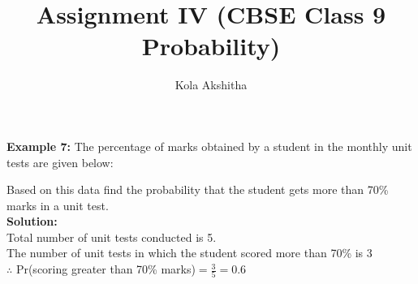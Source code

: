 \documentclass[journal,12pt,onecolumn]{IEEEtran}
\newcommand{\solution}{\noindent \textbf{Solution: }}
\begin{document}
\vspace{3cm}
\title{Assignment IV (CBSE Class 9 Probability)}
\author{Kola Akshitha}
\maketitle
\textbf{Example 7:} The percentage of marks obtained by a student in the monthly unit tests are given below: \\
\begin{table}[ht!]
\begin{center}
    
	\vspace{5pt}
\caption{}
\label{table:table1}
\end{center}
	
\end{table}
Based on this data find the probability that the student gets more than 70\% marks in a unit test. \\
\solution\\
Total number of unit tests conducted is 5.\\
The number of unit tests in which the student scored more than 70\% is 3 \\
$\therefore$ 
   Pr(scoring greater than 70\% marks)$ = \frac{3}{5} = 0.6$
\end{document}
